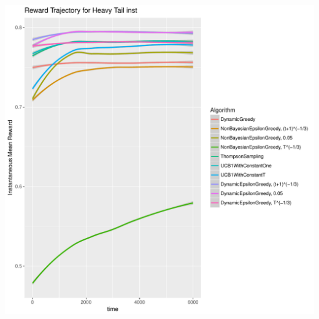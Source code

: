 \documentclass[11pt,letterpaper]{article}
\begin{document}
\includegraphics[scale=0.5]{"../results/Reward Trajectory for Heavy Tail inst"} \\
\end{document}
